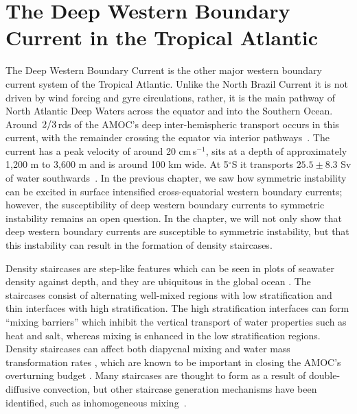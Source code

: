\section{The Deep Western Boundary Current in the Tropical Atlantic}
\label{sec:DWBCIntro}
The Deep Western Boundary Current is the other major western boundary current system of the Tropical Atlantic. Unlike the North Brazil Current it is not driven by wind forcing and gyre circulations, rather, it is the main pathway of North Atlantic Deep Waters across the equator and into the Southern Ocean. Around $\flatfrac{2}{3}$rds of the AMOC's deep inter-hemispheric transport occurs in this current, with the remainder crossing the equator via interior pathways~\citep{Bower2019}. The current has a peak velocity of around 20 cm\,s$^{-1}$, sits at a depth of approximately 1,200 m to 3,600 m and is around 100 km wide. At 5$^\circ$S it transports $25.5\pm8.3$ Sv of water southwards~\citep{Schott2005}. In the previous chapter, we saw how symmetric instability can be excited in surface intensified cross-equatorial western boundary currents; however, the susceptibility of deep western boundary currents to symmetric instability remains an open question. In the chapter, we will not only show that deep western boundary currents are susceptible to symmetric instability, but that this instability can result in the formation of density staircases.

Density staircases are step-like features which can be seen in plots of seawater density against depth, and they are ubiquitous in the global ocean \cite{Stern1960,Schmitt1987,Melling1984,Tait1968,Johannessen1974,Lambert1977}. The staircases consist of alternating well-mixed regions with low stratification and thin interfaces with high stratification. The high stratification interfaces can form ``mixing barriers'' which inhibit the vertical transport of water properties such as heat and salt, whereas mixing is enhanced in the low stratification regions. Density staircases can affect both diapycnal mixing and water mass transformation rates \citep{Schmitt2005}, which are known to be important in closing the AMOC's overturning budget \citep{DeLavergne2022}. Many staircases are thought to form as a result of double-diffusive convection, but other staircase generation mechanisms have been identified, such as inhomogeneous mixing~\citep{Balmforth1998}.



